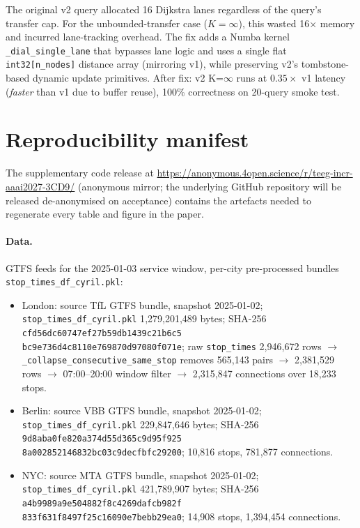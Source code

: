 \documentclass[letterpaper]{article}
\begin{document}
The original v2 query allocated 16 Dijkstra lanes regardless of the
query's transfer cap. For the unbounded-transfer case ($K\!=\!\infty$),
this wasted 16$\times$ memory and incurred lane-tracking overhead. The
fix adds a Numba kernel \texttt{\_dial\_single\_lane} that bypasses
lane logic and uses a single flat \texttt{int32[n\_nodes]} distance
array (mirroring v1), while preserving v2's tombstone-based dynamic
update primitives. After fix: v2 K=$\infty$ runs at $0.35\times$ v1
latency (\emph{faster} than v1 due to buffer reuse), 100\% correctness
on 20-query smoke test.

\section{Reproducibility manifest}
\label{app:repro}

The supplementary code release at
\url{https://anonymous.4open.science/r/teeg-incr-aaai2027-3CD9/}
(anonymous mirror; the underlying GitHub repository will be released
de-anonymised on acceptance) contains the artefacts needed to
regenerate every table and figure in the paper.

\paragraph{Data.}
GTFS feeds for the 2025-01-03 service window, per-city pre-processed
bundles \texttt{stop\_times\_df\_cyril.pkl}:
\begin{itemize}
\item London: source TfL GTFS bundle, snapshot 2025-01-02;
  \texttt{stop\_times\_df\_cyril.pkl} 1{,}279{,}201{,}489 bytes;
  SHA-256
  \texttt{cfd56dc60747ef27b59db1439c21b6c5\\bc9e736d4c8110e769870d97080f071e};
  raw \texttt{stop\_times} 2{,}946{,}672 rows
  $\to$ \texttt{\_collapse\_consecutive\_same\_stop} removes 565{,}143
  pairs $\to$ 2{,}381{,}529 rows $\to$ 07:00--20:00 window filter
  $\to$ 2{,}315{,}847 connections over 18{,}233 stops.
\item Berlin: source VBB GTFS bundle, snapshot 2025-01-02;
  \texttt{stop\_times\_df\_cyril.pkl} 229{,}847{,}646 bytes;
  SHA-256
  \texttt{9d8aba0fe820a374d55d365c9d95f925\\8a002852146832bc03c9decfbfc29200};
  10{,}816 stops, 781{,}877 connections.
\item NYC: source MTA GTFS bundle, snapshot 2025-01-02;
  \texttt{stop\_times\_df\_cyril.pkl} 421{,}789{,}907 bytes;
  SHA-256
  \texttt{a4b9989a9e504882f8c4269dafcb982f\\833f631f8497f25c16090e7bebb29ea0};
  14{,}908 stops, 1{,}394{,}454 connections.
\end{itemize}
\end{document}
